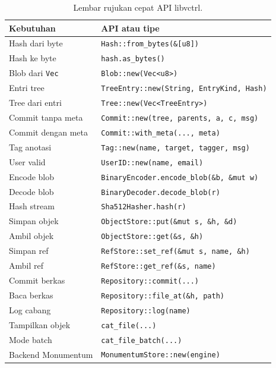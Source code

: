 \documentclass[11pt,a4paper]{article}
\begin{document}
\begin{table}[H]
	\centering
	\caption{Lembar rujukan cepat API libvctrl.}
	\label{tab:cepat}
	\footnotesize
	\begin{tabularx}{\textwidth}{l X}
		\toprule
		Kebutuhan & API atau tipe \\
		\midrule
		Hash dari byte & \texttt{Hash::from\_bytes(\&[u8])} \\
		Hash ke byte & \texttt{hash.as\_bytes()} \\
		Blob dari \texttt{Vec} & \texttt{Blob::new(Vec<u8>)} \\
		Entri tree & \texttt{TreeEntry::new(String, EntryKind, Hash)} \\
		Tree dari entri & \texttt{Tree::new(Vec<TreeEntry>)} \\
		Commit tanpa meta & \texttt{Commit::new(tree, parents, a, c, msg)} \\
		Commit dengan meta & \texttt{Commit::with\_meta(..., meta)} \\
		Tag anotasi & \texttt{Tag::new(name, target, tagger, msg)} \\
		User valid & \texttt{UserID::new(name, email)} \\
		Encode blob & \texttt{BinaryEncoder.encode\_blob(\&b, \&mut w)} \\
		Decode blob & \texttt{BinaryDecoder.decode\_blob(r)} \\
		Hash stream & \texttt{Sha512Hasher.hash(r)} \\
		Simpan objek & \texttt{ObjectStore::put(\&mut s, \&h, \&d)} \\
		Ambil objek & \texttt{ObjectStore::get(\&s, \&h)} \\
		Simpan ref & \texttt{RefStore::set\_ref(\&mut s, name, \&h)} \\
		Ambil ref & \texttt{RefStore::get\_ref(\&s, name)} \\
		Commit berkas & \texttt{Repository::commit(...)} \\
		Baca berkas & \texttt{Repository::file\_at(\&h, path)} \\
		Log cabang & \texttt{Repository::log(name)} \\
		Tampilkan objek & \texttt{cat\_file(...)} \\
		Mode batch & \texttt{cat\_file\_batch(...)} \\
		Backend Monumentum & \texttt{MonumentumStore::new(engine)} \\
		\bottomrule
	\end{tabularx}
\end{table}
\end{document}
